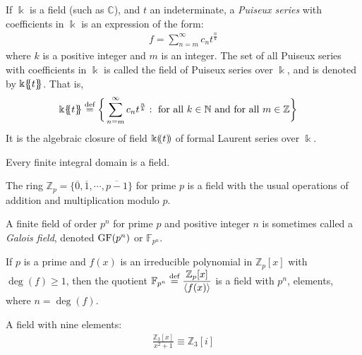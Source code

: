 \documentclass[a4paper, 12pt]{book} %
\begin{document}
\begin{example}
If $\Bbbk$ is a field (such as $\mathbb{C}$), and $t$ an indeterminate, a \emph{Puiseux series} with coefficients in $\Bbbk$ is an expression of the form:
\begin{align}
    f = \sum_{n=m}^{\infty} c_n t^{ \frac{n}{k} }
\end{align}
where $k$ is a positive integer and $m$ is an integer. The set of all Puiseux series with coefficients in $\Bbbk$ is called the field of Puiseux series over $\Bbbk$, and is denoted by $\Bbbk\{\kern-.3em\{t\}\kern-.3em\}$. That is,
\begin{align}
    \Bbbk\{\kern-.3em\{t\}\kern-.3em\} &\overset{\text{def}}{=} \bigg\{ \sum_{n=m}^{\infty} c_n t^{ \frac{n}{k} }: ~\text{for all}~ k \in \mathbb{N}~\text{and for all}~ m \in \mathbb{Z} \bigg\}
\end{align}
It is the algebraic closure of field $\Bbbk(\kern-.2em(t)\kern-.2em)$ of formal Laurent series over $\Bbbk$.
\end{example}

\begin{theorem}
    Every finite integral domain is a field.
\end{theorem}


\begin{example}
    The ring $\mathbb{Z}_p = \{\overline{0}, \overline{1}, \cdots, \overline{p-1}\}$ for prime $p$ is a field with the usual operations of addition and multiplication modulo $p$.
\end{example}

A finite field of order $p^n$ for prime $p$ and positive integer $n$ is sometimes called a \emph{Galois field}, denoted $\mathrm{GF}(p^n)$ or $\mathbb{F}_{p^n}$.

\begin{proposition}
    If $p$ is a prime and $f(x)$ is an irreducible polynomial in $\mathbb{Z}_p[x]$ with $\deg(f) \geq 1$, then the quotient $\mathbb{F}_{p^n} \overset{\text{def}}{=} \dfrac{\mathbb{Z}_p[x]}{\langle f(x) \rangle}$ is a field with $p^n$, elements, where $n = \deg(f)$.
\end{proposition}

\begin{example}
    A field with nine elements: 
    \begin{align}
        \frac{\mathbb{Z}_3[x]}{x^2 + 1} \equiv \mathbb{Z}_3[i]
    \end{align}
\end{example}
\end{document}
